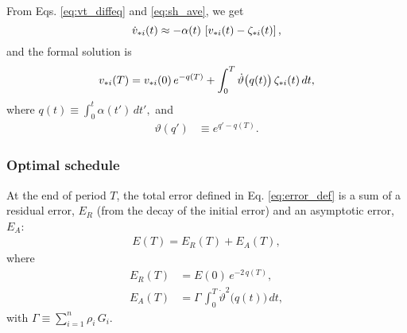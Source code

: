 \documentclass[preprint, superscriptaddress, floatfix]{revtex4-1}
\newcommand{\Err}{E}
\begin{document}
From Eqs.
\eqref{eq:vt_diffeq} and \eqref{eq:sh_ave},
we get %
%
\begin{equation}
  \dot v_{*i}(t)
  \approx
  -\alpha(t) \, \left[ v_{*i}(t) - \zeta_{*i}(t) \right]
  ,
  \notag
\end{equation}
%
and the formal solution is
%
\begin{equation}
  v_{*i}(T)
=
  v_{*i}(0) \, e^{-q(T)}
+
\int_0^T
  \dot \vartheta\bigl( q(t) \bigr) \, \zeta_{*i}(t) \, dt,
\notag
\end{equation}
%
where
%
$
q(t) \equiv \int_0^t \alpha(t') \, dt',
$
%
and
%
\begin{align}
\vartheta(q')
&\equiv
e^{q' - q(T)}.
\label{eq:theta_def}
\end{align}



\subsubsection{Optimal schedule}



At the end of period $T$,
the total error defined in Eq. \eqref{eq:error_def}
is a sum of a residual error, $E_R$ (from the decay of the initial error)
and an asymptotic error, $E_A$:
%
\begin{align}
  \Err(T)
  =
  \Err_R(T) + \Err_A(T)
  ,
  \label{eq:error_tot}
\end{align}
%
where
\begin{align}
  \Err_R(T)
  &= \Err(0) \, e^{-2 \, q(T)}
  ,
  \label{eq:ER_sbin}
  \\
  \Err_A(T)
  &= \Gamma \, \int_0^T \dot \vartheta^2\bigl( q(t) \bigr) \, dt
  ,
  \label{eq:EA_sbin}
\end{align}
with
$\Gamma \equiv \sum_{i=1}^n \rho_i \, G_i$.
\end{document}

